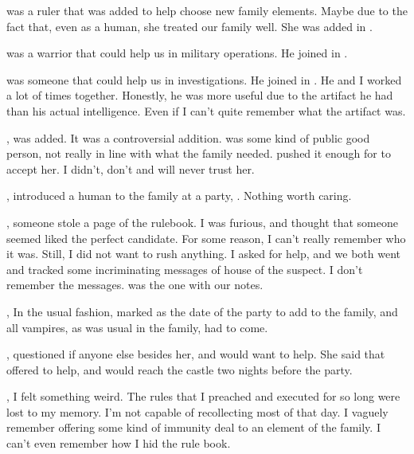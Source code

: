 { was a ruler that was added to help choose new family elements. Maybe due to the fact that, even as a human, she treated our family well. She was added in .

 was a warrior that could help us in military operations. He joined in .

 was someone that could help us in investigations. He joined in . He and I worked a lot of times together. Honestly, he was more useful due to the artifact he had than his actual intelligence. Even if I can't quite remember what the artifact was.

,  was added. It was a controversial addition.  was some kind of public good person, not really in line with what the family needed.  pushed it enough for  to accept her. I didn't, don't and will never trust her.

,  introduced a human to the family at a party, . Nothing worth caring.

, someone stole a page of the rulebook. I was furious, and thought that someone seemed liked the perfect candidate. For some reason, I can't really remember who it was. Still, I did not want to rush anything. I asked  for help, and we both went and tracked some incriminating messages of house of the suspect. I don't remember the messages.  was the one with our notes.


, In the usual fashion, marked  as the date of the party to add  to the family, and all vampires, as was usual in the family, had to come.

,  questioned if anyone else besides her,  and  would want to help. She said that  offered to help, and would reach the castle two nights before the party.


, I felt something weird. The rules that I preached and executed for so long were lost to my memory. I'm not capable of recollecting most of that day. I vaguely remember offering some kind of immunity deal to an element of the family. I can't even remember how I hid the rule book.

}
